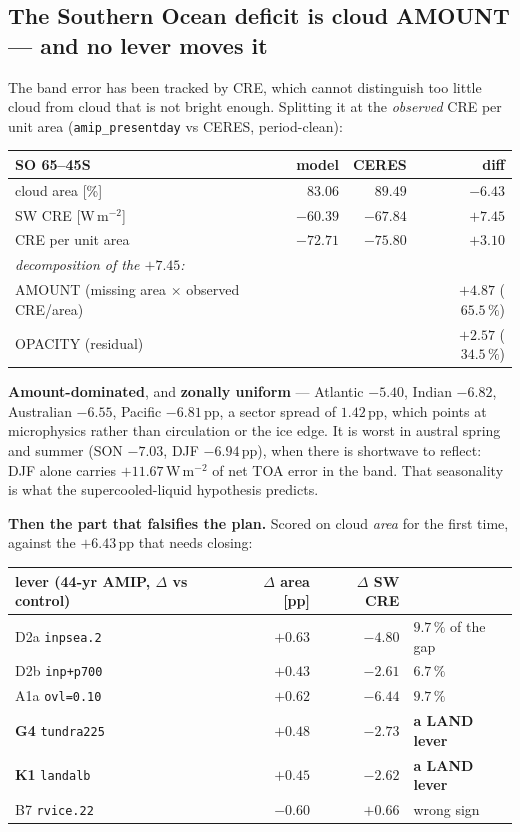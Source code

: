 \documentclass[10pt]{article}
\begin{document}
\subsection{The Southern Ocean deficit is cloud AMOUNT --- and no lever moves
it}\label{sub:socloudarea}
The band error has been tracked by CRE, which cannot distinguish too little cloud from
cloud that is not bright enough. Splitting it at the \emph{observed} CRE per unit area
(\texttt{amip\_presentday} vs CERES, period-clean):

\begin{center}\footnotesize
\begin{tabular}{l r r r}
\toprule
SO 65--45S & model & CERES & diff \\
\midrule
cloud area [\%] & $83.06$ & $89.49$ & $\mathbf{-6.43}$ \\
SW CRE [W\,m$^{-2}$] & $-60.39$ & $-67.84$ & $\mathbf{+7.45}$ \\
CRE per unit area & $-72.71$ & $-75.80$ & $+3.10$ \\
\midrule
\multicolumn{4}{l}{\emph{decomposition of the $+7.45$:}}\\
AMOUNT (missing area $\times$ observed CRE/area) & & & $\mathbf{+4.87}$ \quad($65.5\,\%$) \\
OPACITY (residual) & & & $+2.57$ \quad($34.5\,\%$) \\
\bottomrule
\end{tabular}
\end{center}

\noindent \textbf{Amount-dominated}, and \textbf{zonally uniform} --- Atlantic $-5.40$,
Indian $-6.82$, Australian $-6.55$, Pacific $-6.81$\,pp, a sector spread of $1.42$\,pp,
which points at microphysics rather than circulation or the ice edge. It is worst in
austral spring and summer (SON $-7.03$, DJF $-6.94$\,pp), when there is shortwave to
reflect: DJF alone carries $+11.67$\,W\,m$^{-2}$ of net TOA error in the band. That
seasonality is what the supercooled-liquid hypothesis predicts.

\textbf{Then the part that falsifies the plan.} Scored on cloud \emph{area} for the first
time, against the $+6.43$\,pp that needs closing:

\begin{center}\footnotesize
\begin{tabular}{l r r l}
\toprule
lever (44-yr AMIP, $\Delta$ vs control) & $\Delta$ area [pp] & $\Delta$ SW CRE & \\
\midrule
D2a \texttt{inpsea.2} & $+0.63$ & $-4.80$ & $9.7\,\%$ of the gap \\
D2b \texttt{inp+p700} & $+0.43$ & $-2.61$ & $6.7\,\%$ \\
A1a \texttt{ovl=0.10} & $+0.62$ & $-6.44$ & $9.7\,\%$ \\
\textbf{G4} \texttt{tundra225} & $+0.48$ & $-2.73$ & \textbf{a LAND lever} \\
\textbf{K1} \texttt{landalb} & $+0.45$ & $-2.62$ & \textbf{a LAND lever} \\
B7 \texttt{rvice.22} & $-0.60$ & $+0.66$ & wrong sign \\
\bottomrule
\end{tabular}
\end{center}
\end{document}
